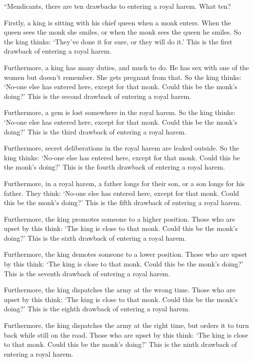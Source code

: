 \documentclass[12pt,openany]{book}%
\begin{document}
“Mendicants, there are ten drawbacks to entering a royal harem. What ten? 

Firstly, a king is sitting with his chief queen when a monk enters. When the queen sees the monk she smiles, or when the monk sees the queen he smiles. So the king thinks: ‘They’ve done it for sure, or they will do it.’ This is the first drawback of entering a royal harem. 

Furthermore, a king has many duties, and much to do. He has sex with one of the women but doesn’t remember. She gets pregnant from that. So the king thinks: ‘No-one else has entered here, except for that monk. Could this be the monk’s doing?’ This is the second drawback of entering a royal harem. 

Furthermore, a gem is lost somewhere in the royal harem. So the king thinks: ‘No-one else has entered here, except for that monk. Could this be the monk’s doing?’ This is the third drawback of entering a royal harem. 

Furthermore, secret deliberations in the royal harem are leaked outside. So the king thinks: ‘No-one else has entered here, except for that monk. Could this be the monk’s doing?’ This is the fourth drawback of entering a royal harem. 

Furthermore, in a royal harem, a father longs for their son, or a son longs for his father. They think: ‘No-one else has entered here, except for that monk. Could this be the monk’s doing?’ This is the fifth drawback of entering a royal harem. 

Furthermore, the king promotes someone to a higher position. Those who are upset by this think: ‘The king is close to that monk. Could this be the monk’s doing?’ This is the sixth drawback of entering a royal harem. 

Furthermore, the king demotes someone to a lower position. Those who are upset by this think: ‘The king is close to that monk. Could this be the monk’s doing?’ This is the seventh drawback of entering a royal harem. 

Furthermore, the king dispatches the army at the wrong time. Those who are upset by this think: ‘The king is close to that monk. Could this be the monk’s doing?’ This is the eighth drawback of entering a royal harem. 

Furthermore, the king dispatches the army at the right time, but orders it to turn back while still on the road. Those who are upset by this think: ‘The king is close to that monk. Could this be the monk’s doing?’ This is the ninth drawback of entering a royal harem. 
\end{document}
